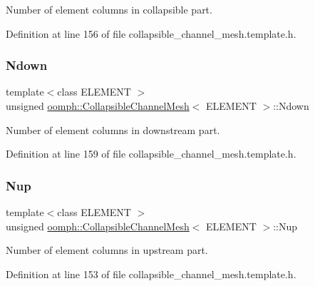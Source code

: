 Number of element columns in collapsible part. 



Definition at line 156 of file collapsible\+\_\+channel\+\_\+mesh.\+template.\+h.

\mbox{\label{classoomph_1_1CollapsibleChannelMesh_acd1b5ea7597a079b4321d3658f2e03f4}} 
\subsubsection{\texorpdfstring{Ndown}{Ndown}}
{\footnotesize\ttfamily template$<$class E\+L\+E\+M\+E\+NT $>$ \\
unsigned \hyperlink{classoomph_1_1CollapsibleChannelMesh}{oomph\+::\+Collapsible\+Channel\+Mesh}$<$ E\+L\+E\+M\+E\+NT $>$\+::Ndown\hspace{0.3cm}{\ttfamily [protected]}}



Number of element columns in downstream part. 



Definition at line 159 of file collapsible\+\_\+channel\+\_\+mesh.\+template.\+h.

\mbox{\label{classoomph_1_1CollapsibleChannelMesh_aafd1c6d21bb891f1188ba6eed1705a45}} 
\subsubsection{\texorpdfstring{Nup}{Nup}}
{\footnotesize\ttfamily template$<$class E\+L\+E\+M\+E\+NT $>$ \\
unsigned \hyperlink{classoomph_1_1CollapsibleChannelMesh}{oomph\+::\+Collapsible\+Channel\+Mesh}$<$ E\+L\+E\+M\+E\+NT $>$\+::Nup\hspace{0.3cm}{\ttfamily [protected]}}



Number of element columns in upstream part. 



Definition at line 153 of file collapsible\+\_\+channel\+\_\+mesh.\+template.\+h.

